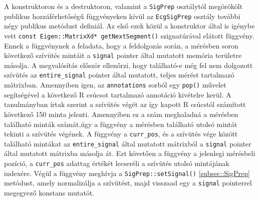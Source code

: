 \documentclass[oneside,titlepage,12pt,a4paper]{report}
\begin{document}
\par A konstruktoron és a destruktoron, valamint a 
\texttt{SigPrep} osztálytól megörökölt publikus hozzáférhetőségű függvényeken kívül az
\texttt{EcgSigPrep} osztály további négy publikus metódust definiál. Az első ezek közül a konstruktor által is igénybe vett 
\texttt{const Eigen::MatrixXd* getNextSegment()} 
szignatúrával elátott függvény. Ennek a függvénynek a feladata, hogy a feldolgozás során, a mérésben soron következő szívütés mintáit a \texttt{signal} pointer által mutatott memória területre másolja. A megvalósítás először ellenőrzi, hogy található-e még fel nem dolgozott szívütés az 
\texttt{entire\_signal} pointer által mutatott, teljes mérést tartalmazó mátrixban. Amennyiben igen, az \texttt{annotations} sorból egy \texttt{pop()} 
művelet segítségével a következő R csúcsot tartalmazó annotáció kivételre kerül. A \cite{origCikk} tanulmányban írtak szerint a szívütés végét az így kapott R csúcstól számított következő 150 minta jelenti. Amennyiben ez a szám meghaladná a mérésben található minták számát,úgy a függvény a mérésben található utolsó mintát tekinti a szívütés végének. A függvény a \texttt{curr\_pos}, és a szívütés vége között található mintákat az \texttt{entire\_signal} által mutatott mátrixból a \texttt{signal} pointer által mutatott mátrixba másolja át. Ezt követően a függvény a jelenlegi mérésbeli pozíció, a \texttt{curr\_pos} adattag értékét lecseréli a szívütés utolsó mintájának indexére. Végül a függvény meghívja a \texttt{SigPrep::setSignal()} \ref{subsec::SigPrep} metódust, amely normalizálja  a szívütést, majd visszaad egy a \texttt{signal} pointerrel megegyező konstans mutatót. 
\end{document}
